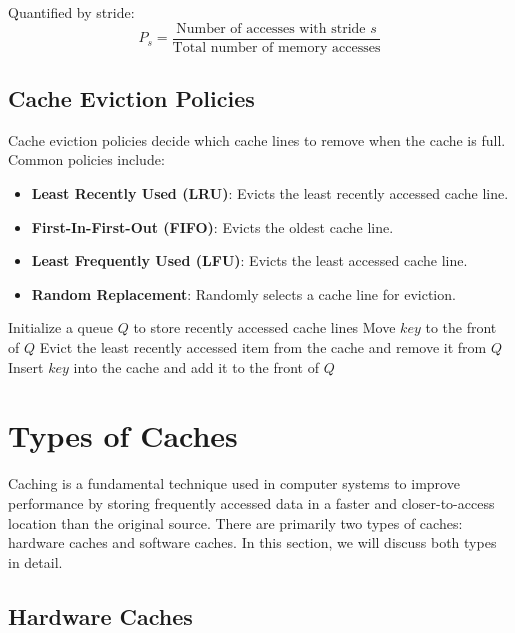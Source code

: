 \documentclass[12pt]{book} %
\begin{document}
Quantified by stride:
\[
P_s = \frac{\text{Number of accesses with stride } s}{\text{Total number of memory accesses}}
\]

\subsection{Cache Eviction Policies}

Cache eviction policies decide which cache lines to remove when the cache is full. Common policies include:

\begin{itemize}
    \item \textbf{Least Recently Used (LRU)}: Evicts the least recently accessed cache line.
    \item \textbf{First-In-First-Out (FIFO)}: Evicts the oldest cache line.
    \item \textbf{Least Frequently Used (LFU)}: Evicts the least accessed cache line.
    \item \textbf{Random Replacement}: Randomly selects a cache line for eviction.
\end{itemize}

\FloatBarrier
\begin{algorithm}[h]
\caption{Least Recently Used (LRU) Cache Eviction Policy}
\begin{algorithmic}[1]
\State Initialize a queue $Q$ to store recently accessed cache lines
\State Move $key$ to the front of $Q$
\Else
\State Evict the least recently accessed item from the cache and remove it from $Q$
\State Insert $key$ into the cache and add it to the front of $Q$
\EndIf
\EndProcedure
\end{algorithmic}
\end{algorithm}
\FloatBarrier

\section{Types of Caches}

Caching is a fundamental technique used in computer systems to improve performance by storing frequently accessed data in a faster and closer-to-access location than the original source. There are primarily two types of caches: hardware caches and software caches. In this section, we will discuss both types in detail.

\subsection{Hardware Caches}
\end{document}
